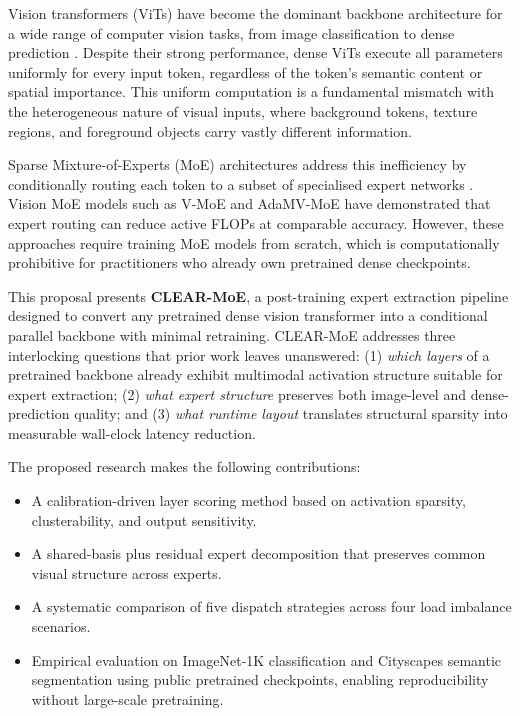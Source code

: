 \documentclass[conference]{IEEEtran}
\begin{document}
Vision transformers (ViTs) have become the dominant backbone architecture for a wide range of computer vision tasks, from image classification to dense prediction \cite{dosovitskiy2021vit, liu2021swin}. Despite their strong performance, dense ViTs execute all parameters uniformly for every input token, regardless of the token's semantic content or spatial importance. This uniform computation is a fundamental mismatch with the heterogeneous nature of visual inputs, where background tokens, texture regions, and foreground objects carry vastly different information.

Sparse Mixture-of-Experts (MoE) architectures address this inefficiency by conditionally routing each token to a subset of specialised expert networks \cite{shazeer2017outrageously}. Vision MoE models such as V-MoE \cite{riquelme2021vmoe} and AdaMV-MoE \cite{chen2023adamvmoe} have demonstrated that expert routing can reduce active FLOPs at comparable accuracy. However, these approaches require training MoE models from scratch, which is computationally prohibitive for practitioners who already own pretrained dense checkpoints.

This proposal presents \textbf{CLEAR-MoE}, a post-training expert extraction pipeline designed to convert any pretrained dense vision transformer into a conditional parallel backbone with minimal retraining. CLEAR-MoE addresses three interlocking questions that prior work leaves unanswered: (1) \textit{which layers} of a pretrained backbone already exhibit multimodal activation structure suitable for expert extraction; (2) \textit{what expert structure} preserves both image-level and dense-prediction quality; and (3) \textit{what runtime layout} translates structural sparsity into measurable wall-clock latency reduction.

The proposed research makes the following contributions:
\begin{itemize}
    \item A calibration-driven layer scoring method based on activation sparsity, clusterability, and output sensitivity.
    \item A shared-basis plus residual expert decomposition that preserves common visual structure across experts.
    \item A systematic comparison of five dispatch strategies across four load imbalance scenarios.
    \item Empirical evaluation on ImageNet-1K classification and Cityscapes semantic segmentation using public pretrained checkpoints, enabling reproducibility without large-scale pretraining.
\end{itemize}
\end{document}
